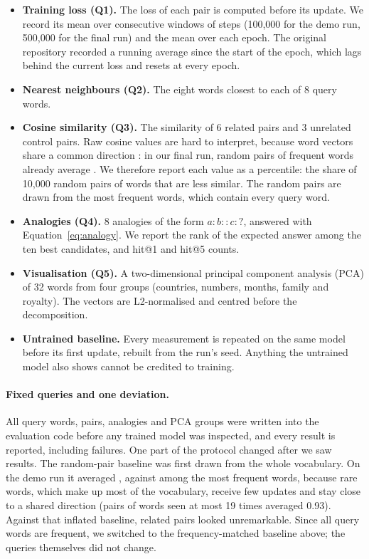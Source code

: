 \begin{itemize}
    \item \textbf{Training loss (Q1).} The loss of each pair is computed before its update. We record its mean over consecutive windows of steps (100,000 for the demo run, 500,000 for the final run) and the mean over each epoch. The original repository recorded a running average since the start of the epoch, which lags behind the current loss and resets at every epoch.
    \item \textbf{Nearest neighbours (Q2).} The eight words closest to each of 8 query words.
    \item \textbf{Cosine similarity (Q3).} The similarity of 6 related pairs and 3 unrelated control pairs. Raw cosine values are hard to interpret, because word vectors share a common direction \citep{mu2018allbutthetop}: in our final run, random pairs of frequent words already average \FinalBaselineMean. We therefore report each value as a percentile: the share of 10,000 random pairs of words that are less similar. The random pairs are drawn from the \BaselineWords{} most frequent words, which contain every query word.
    \item \textbf{Analogies (Q4).} 8 analogies of the form $a : b :: c : ?$, answered with Equation~\eqref{eq:analogy}. We report the rank of the expected answer among the ten best candidates, and hit@1 and hit@5 counts.
    \item \textbf{Visualisation (Q5).} A two-dimensional principal component analysis (PCA) of 32 words from four groups (countries, numbers, months, family and royalty). The vectors are L2-normalised and centred before the decomposition.
    \item \textbf{Untrained baseline.} Every measurement is repeated on the same model before its first update, rebuilt from the run's seed. Anything the untrained model also shows cannot be credited to training.
\end{itemize}

\paragraph{Fixed queries and one deviation.}
All query words, pairs, analogies and PCA groups were written into the evaluation code before any trained model was inspected, and every result is reported, including failures. One part of the protocol changed after we saw results. The random-pair baseline was first drawn from the whole vocabulary. On the demo run it averaged \DemoBaselineAllMean, against \DemoBaselineMean{} among the \BaselineWords{} most frequent words, because rare words, which make up most of the vocabulary, receive few updates and stay close to a shared direction (pairs of words seen at most 19 times averaged 0.93). Against that inflated baseline, related pairs looked unremarkable. Since all query words are frequent, we switched to the frequency-matched baseline above; the queries themselves did not change.
